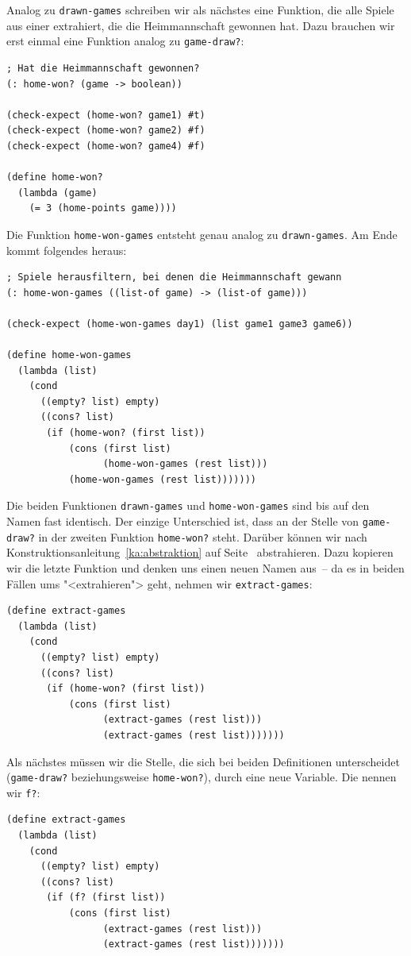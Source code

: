 Analog zu \lstinline{drawn-games} schreiben wir als nächstes eine
Funktion, die alle Spiele aus einer extrahiert, die die Heimmannschaft
gewonnen hat.  Dazu brauchen wir erst einmal eine Funktion analog zu
\lstinline{game-draw?}:
%
\begin{lstlisting}
; Hat die Heimmannschaft gewonnen?
(: home-won? (game -> boolean))

(check-expect (home-won? game1) #t)
(check-expect (home-won? game2) #f)
(check-expect (home-won? game4) #f)

(define home-won?
  (lambda (game)
    (= 3 (home-points game))))
\end{lstlisting}
%
Die Funktion \lstinline{home-won-games} entsteht genau analog zu
\lstinline{drawn-games}.  Am Ende kommt folgendes heraus:
%
\begin{lstlisting}
; Spiele herausfiltern, bei denen die Heimmannschaft gewann
(: home-won-games ((list-of game) -> (list-of game)))

(check-expect (home-won-games day1) (list game1 game3 game6))

(define home-won-games
  (lambda (list)
    (cond
      ((empty? list) empty)
      ((cons? list)
       (if (home-won? (first list))
           (cons (first list)
                 (home-won-games (rest list)))
           (home-won-games (rest list)))))))
\end{lstlisting}
%
Die beiden Funktionen \lstinline{drawn-games} und
\lstinline{home-won-games} sind bis auf den Namen fast identisch.  Der
einzige Unterschied ist, dass an der Stelle von \lstinline{game-draw?}
in der zweiten Funktion \lstinline{home-won?} steht.  Darüber können
wir nach Konstruktionsanleitung~\ref{ka:abstraktion} auf
Seite~\pageref{ka:abstraktion} abstrahieren.  Dazu kopieren wir die
letzte Funktion und denken uns einen neuen Namen aus~-- da es in
beiden Fällen ums "<extrahieren"> geht, nehmen wir
\lstinline{extract-games}:
%
\begin{lstlisting}
(define extract-games
  (lambda (list)
    (cond
      ((empty? list) empty)
      ((cons? list)
       (if (home-won? (first list))
           (cons (first list)
                 (extract-games (rest list)))
                 (extract-games (rest list)))))))
\end{lstlisting}
%
Als nächstes müssen wir die Stelle, die sich bei beiden Definitionen
unterscheidet (\lstinline{game-draw?} beziehungsweise
\lstinline{home-won?}), durch eine neue Variable.  Die nennen wir
\lstinline{f?}:
%
\begin{lstlisting}
(define extract-games
  (lambda (list)
    (cond
      ((empty? list) empty)
      ((cons? list)
       (if (f? (first list))
           (cons (first list)
                 (extract-games (rest list)))
                 (extract-games (rest list)))))))
\end{lstlisting}
